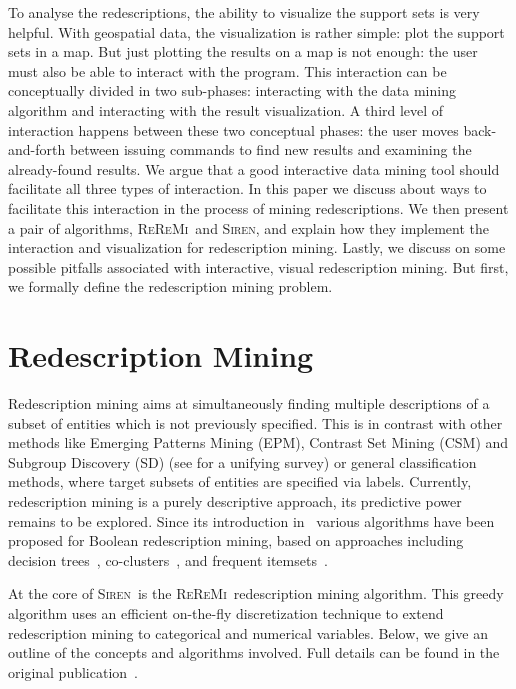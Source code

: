 \documentclass{llncs}
\renewcommand{\note}[1]{{\color{red}{#1}\par}}
\newcommand{\Siren}{\textsc{Siren}}
\newcommand{\ReReMi}{\textsc{ReReMi}}
\begin{document}
To analyse the redescriptions, the ability to visualize the support
sets is very helpful. With geospatial data, the visualization is
rather simple: plot the support sets in a map. But just plotting the
results on a map is not enough: the user must also be able to interact
with the program. This interaction can be conceptually divided in two
sub-phases: interacting with the data mining algorithm and interacting
with the result visualization. A third level of interaction happens
between these two conceptual phases: the user moves back-and-forth
between issuing commands to find new results and examining the
already-found results. We argue that a good interactive data mining
tool should facilitate all three types of interaction. In this paper
we discuss about ways to facilitate this interaction in the process of
mining redescriptions. We then present a pair of algorithms, \ReReMi\
and \Siren, and explain how they implement the interaction and
visualization for redescription mining. Lastly, we discuss on some
possible pitfalls associated with interactive, visual redescription
mining. But first, we formally define the redescription mining problem.


\section{Redescription Mining}
\label{sec:redescription-mining}
\note{Esther: restructure so that it only explains the problem: Siren
  and ReReMi belong to a latter phase.}
Redescription mining aims at simultaneously finding multiple
descriptions of a subset of entities which is not previously
specified.  This is in contrast with other methods like Emerging
Patterns Mining (EPM), Contrast Set Mining (CSM) and Subgroup Discovery
(SD) (see \cite{kralj09supervised} for a unifying survey) or general
classification methods, where target subsets of entities are specified
via labels.  Currently, redescription mining is a purely descriptive
approach, its predictive power remains to be explored.  Since its
introduction in~\cite{ramakrishnan04turning} various algorithms have
been proposed for Boolean redescription mining, based on approaches
including decision
trees~\cite{ramakrishnan04turning,kumar07redescription},
co-clusters~\cite{parida05redescription}, and frequent
itemsets~\cite{gallo08finding}.

At the core of \Siren\ is the \ReReMi\ redescription mining
algorithm. This greedy algorithm uses an efficient on-the-fly
discretization technique to extend redescription mining to categorical
and numerical variables.  Below, we give an outline of the concepts and
algorithms involved. Full details can be found
in the original publication~\cite{galbrun11black}.
\end{document}
